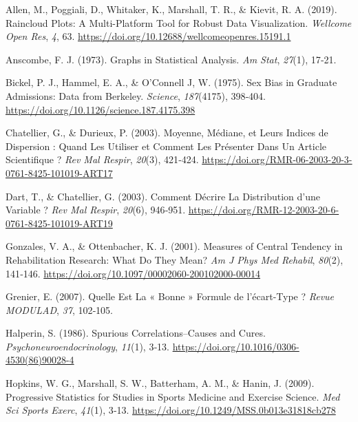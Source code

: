 \documentclass[
  letterpaper,
]{book}
\newlength{\cslhangindent}
\newenvironment{CSLReferences}[2] %
 {\begin{list}{}{%
  \setlength{\itemindent}{0pt}
  \setlength{\leftmargin}{0pt}
  \setlength{\parsep}{0pt}
  \ifodd #1
   \setlength{\leftmargin}{\cslhangindent}
   \setlength{\itemindent}{-1\cslhangindent}
  \fi
  \setlength{\itemsep}{#2\baselineskip}}}
 {\end{list}}
\begin{document}
\label{refs}
\begin{CSLReferences}{1}{0}
Allen, M., Poggiali, D., Whitaker, K., Marshall, T. R., \& Kievit, R. A.
(2019). Raincloud Plots: A Multi-Platform Tool for Robust Data
Visualization. \emph{Wellcome Open Res}, \emph{4}, 63.
\url{https://doi.org/10.12688/wellcomeopenres.15191.1}

Anscombe, F. J. (1973). Graphs in Statistical Analysis. \emph{Am Stat},
\emph{27}(1), 17‑21.

Bickel, P. J., Hammel, E. A., \& O'Connell J, W. (1975). Sex Bias in
Graduate Admissions: Data from Berkeley. \emph{Science},
\emph{187}(4175), 398‑404.
\url{https://doi.org/10.1126/science.187.4175.398}

Chatellier, G., \& Durieux, P. (2003). Moyenne, Médiane, et Leurs
Indices de Dispersion : Quand Les Utiliser et Comment Les Présenter Dans
Un Article Scientifique ? \emph{Rev Mal Respir}, \emph{20}(3), 421‑424.
\url{https://doi.org/RMR-06-2003-20-3-0761-8425-101019-ART17}

Dart, T., \& Chatellier, G. (2003). Comment Décrire La Distribution
d'une Variable ? \emph{Rev Mal Respir}, \emph{20}(6), 946‑951.
\url{https://doi.org/RMR-12-2003-20-6-0761-8425-101019-ART19}

Gonzales, V. A., \& Ottenbacher, K. J. (2001). Measures of Central
Tendency in Rehabilitation Research: What Do They Mean? \emph{Am J Phys
Med Rehabil}, \emph{80}(2), 141‑146.
\url{https://doi.org/10.1097/00002060-200102000-00014}

Grenier, E. (2007). Quelle Est La « Bonne » Formule de l'écart-Type ?
\emph{Revue MODULAD}, \emph{37}, 102‑105.

Halperin, S. (1986). Spurious Correlations--Causes and Cures.
\emph{Psychoneuroendocrinology}, \emph{11}(1), 3‑13.
\url{https://doi.org/10.1016/0306-4530(86)90028-4}

Hopkins, W. G., Marshall, S. W., Batterham, A. M., \& Hanin, J. (2009).
Progressive Statistics for Studies in Sports Medicine and Exercise
Science. \emph{Med Sci Sports Exerc}, \emph{41}(1), 3‑13.
\url{https://doi.org/10.1249/MSS.0b013e31818cb278}


\end{CSLReferences}
\end{document}
